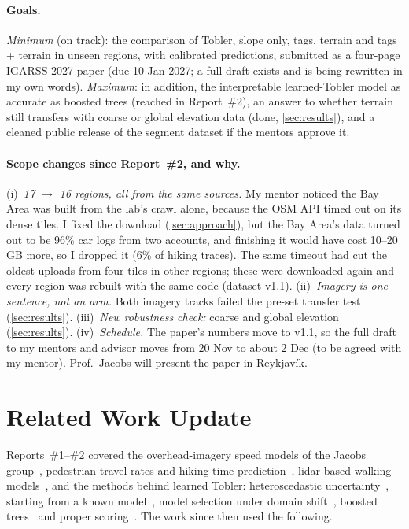 \documentclass[10pt,twocolumn,letterpaper]{article}
\begin{document}
\paragraph{Goals.} \emph{Minimum} (on track): the comparison of Tobler, slope only, tags, terrain and tags + terrain in unseen regions, with calibrated predictions, submitted as a four-page IGARSS 2027 paper (due 10 Jan 2027; a full draft exists and is being rewritten in my own words). \emph{Maximum}: in addition, the interpretable learned-Tobler model as accurate as boosted trees (reached in Report~\#2), an answer to whether terrain still transfers with coarse or global elevation data (done, \cref{sec:results}), and a cleaned public release of the segment dataset if the mentors approve it.

\paragraph{Scope changes since Report~\#2, and why.}
(i)~\emph{17 $\to$ 16 regions, all from the same sources.} My mentor noticed the Bay Area was built from the lab's crawl alone, because the OSM API timed out on its dense tiles. I fixed the download (\cref{sec:approach}), but the Bay Area's data turned out to be 96\% car logs from two accounts, and finishing it would have cost 10--20\,GB more, so I dropped it (6\% of hiking traces). The same timeout had cut the oldest uploads from four tiles in other regions; these were downloaded again and every region was rebuilt with the same code (dataset v1.1).
(ii)~\emph{Imagery is one sentence, not an arm.} Both imagery tracks failed the pre-set transfer test (\cref{sec:results}).
(iii)~\emph{New robustness check:} coarse and global elevation (\cref{sec:results}).
(iv)~\emph{Schedule.} The paper's numbers move to v1.1, so the full draft to my mentors and advisor moves from 20 Nov to about 2 Dec (to be agreed with my mentor). Prof.\ Jacobs will present the paper in Reykjavík.

\section{Related Work Update}
\label{sec:related}

Reports~\#1--\#2 covered the overhead-imagery speed models of the Jacobs group~\cite{hadzic2020rasternet,workman2020dynamic,workman2024probabilistic}, pedestrian travel rates and hiking-time prediction~\cite{asako2024hikingtte,campbell2022variability}, lidar-based walking models~\cite{campbell2018understory,campbell2024stride,cutler2026machine}, and the methods behind learned Tobler: heteroscedastic uncertainty~\cite{kendall2017uncertainties}, starting from a known model~\cite{zhang2023controlnet}, model selection under domain shift~\cite{gulrajani2021lost}, boosted trees~\cite{ke2017lightgbm} and proper scoring~\cite{gneiting2007strictly}. The work since then used the following.
\end{document}
